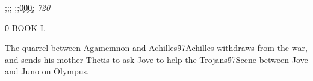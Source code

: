 {\ansi{}
{;;;}
{\*\expandedcolortbl;;\cssrgb\c0\c0\c0;}
\pard{}\sl720\qc{}

\f0  
  BOOK I.\
\pard{}\qj{}

  The quarrel between Agamemnon and Achilles\'97Achilles withdraws from the war, and sends his mother Thetis to ask Jove to help the Trojans\'97Scene between Jove and Juno on Olympus.\
\pard{}\qj{}

}
